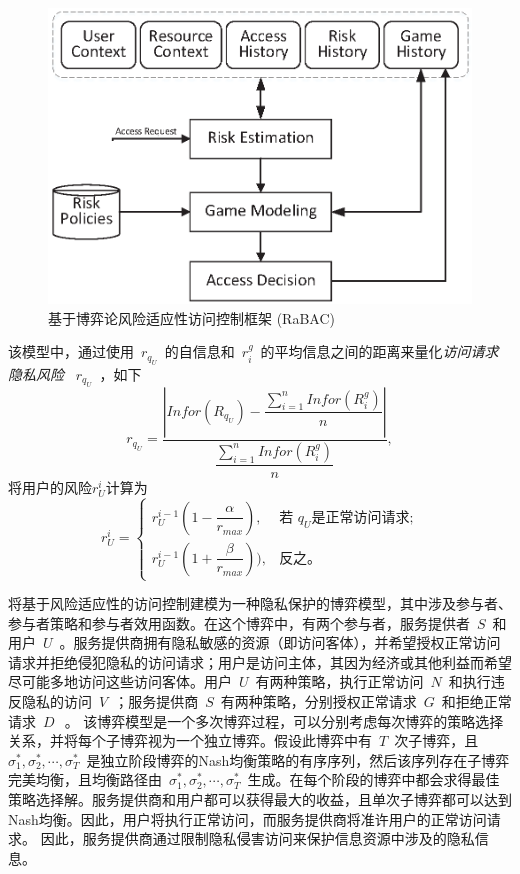 \documentclass[pdftex,notypeinfo,twoside,openany,UTF8,fntef]{CASthesis}
\theoremstyle{THrm}{
	\newtheorem{question}{Question}[section]
	\newtheorem{property}{性质}[section]
	\newtheorem{assumption}{假设}[section]
	\newtheorem{claim}[lemma]{断言}
	
}
\begin{document}
\begin{figure}[htb]
	\centering
	\includegraphics[width=.65\textwidth]{./figures/game-rbac-framework.eps}
	\caption{基于博弈论风险适应性访问控制框架 (RaBAC)}\label{fig:game-rbac-framework}
\end{figure}
该模型中，通过使用~$r_{q_U}$~的自信息和~$r^g_i$~的平均信息之间的距离来量化\emph{访问请求隐私风险} ~$r_{q_U}$~，如下
\begin{equation}\label{eq:privacy_risk_qu}
r_{q_U} = \dfrac{|Infor(R_{q_U})-\dfrac{\sum ^{n}_{i=1} Infor(R^g_i)}{n}|}{\dfrac{\sum ^{n}_{i=1} Infor(R^g_i)}{n}}, 
\end{equation}
将用户的风险$r_U^{i}$计算为
\begin{equation}\label{eq:userrisk}
r_U^{i}=\left\{ 
\begin{array}{cl}
r_U^{i-1}(1-\dfrac{\alpha}{r_{max}}), & \text{若 } q_U \text{是正常访问请求;}\\
r_U^{i-1}(1+\dfrac{\beta}{r_{max}})), & \text{反之。}
\end{array}
\right.
\end{equation}

将基于风险适应性的访问控制建模为一种隐私保护的博弈模型，其中涉及参与者、参与者策略和参与者效用函数。在这个博弈中，有两个参与者，服务提供者~$S$~和用户~$U$~。服务提供商拥有隐私敏感的资源（即访问客体），并希望授权正常访问请求并拒绝侵犯隐私的访问请求；用户是访问主体，其因为经济或其他利益而希望尽可能多地访问这些访问客体。用户~$U$~有两种策略，执行正常访问~$N$~和执行违反隐私的访问~$V$~；服务提供商~$S$~有两种策略，分别授权正常请求~$G$~和拒绝正常请求~$D~$~。
该博弈模型是一个多次博弈过程，可以分别考虑每次博弈的策略选择关系，并将每个子博弈视为一个独立博弈。假设此博弈中有~$T$~次子博弈，且~$\sigma_1^*, \sigma_2^*, \cdots, \sigma_T^*$~是独立阶段博弈的Nash均衡策略的有序序列，然后该序列存在子博弈完美均衡，且均衡路径由~$\sigma_1^*, \sigma_2^*, \cdots, \sigma_T^*$~生成。在每个阶段的博弈中都会求得最佳策略选择解。服务提供商和用户都可以获得最大的收益，且单次子博弈都可以达到Nash均衡。因此，用户将执行正常访问，而服务提供商将准许用户的正常访问请求。 因此，服务提供商通过限制隐私侵害访问来保护信息资源中涉及的隐私信息。
\end{document}
